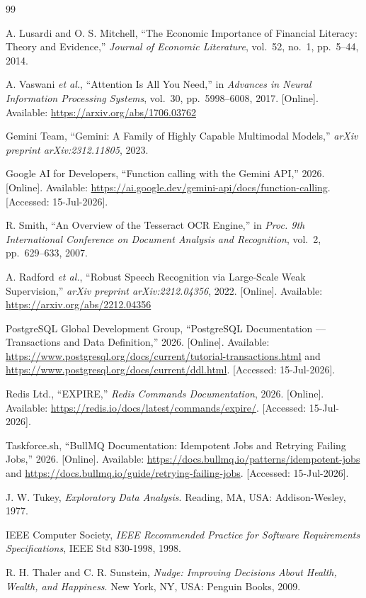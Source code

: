 \cleardoublepage
{}
{}
\begin{thebibliography}{99}

A. Lusardi and O. S. Mitchell, ``The Economic Importance of Financial Literacy: Theory and Evidence,'' \emph{Journal of Economic Literature}, vol.~52, no.~1, pp.~5--44, 2014.

A. Vaswani \emph{et al.}, ``Attention Is All You Need,'' in \emph{Advances in Neural Information Processing Systems}, vol.~30, pp.~5998--6008, 2017. [Online]. Available: \url{https://arxiv.org/abs/1706.03762}

Gemini Team, ``Gemini: A Family of Highly Capable Multimodal Models,'' \emph{arXiv preprint arXiv:2312.11805}, 2023.

Google AI for Developers, ``Function calling with the Gemini API,'' 2026. [Online]. Available: \url{https://ai.google.dev/gemini-api/docs/function-calling}. [Accessed: 15-Jul-2026].

R. Smith, ``An Overview of the Tesseract OCR Engine,'' in \emph{Proc. 9th International Conference on Document Analysis and Recognition}, vol.~2, pp.~629--633, 2007.

A. Radford \emph{et al.}, ``Robust Speech Recognition via Large-Scale Weak Supervision,'' \emph{arXiv preprint arXiv:2212.04356}, 2022. [Online]. Available: \url{https://arxiv.org/abs/2212.04356}

PostgreSQL Global Development Group, ``PostgreSQL Documentation --- Transactions and Data Definition,'' 2026. [Online]. Available: \url{https://www.postgresql.org/docs/current/tutorial-transactions.html} and \url{https://www.postgresql.org/docs/current/ddl.html}. [Accessed: 15-Jul-2026].

Redis Ltd., ``EXPIRE,'' \emph{Redis Commands Documentation}, 2026. [Online]. Available: \url{https://redis.io/docs/latest/commands/expire/}. [Accessed: 15-Jul-2026].

Taskforce.sh, ``BullMQ Documentation: Idempotent Jobs and Retrying Failing Jobs,'' 2026. [Online]. Available: \url{https://docs.bullmq.io/patterns/idempotent-jobs} and \url{https://docs.bullmq.io/guide/retrying-failing-jobs}. [Accessed: 15-Jul-2026].

J. W. Tukey, \emph{Exploratory Data Analysis}. Reading, MA, USA: Addison-Wesley, 1977.

IEEE Computer Society, \emph{IEEE Recommended Practice for Software Requirements Specifications}, IEEE Std 830-1998, 1998.

R. H. Thaler and C. R. Sunstein, \emph{Nudge: Improving Decisions About Health, Wealth, and Happiness}. New York, NY, USA: Penguin Books, 2009.

\end{thebibliography}
